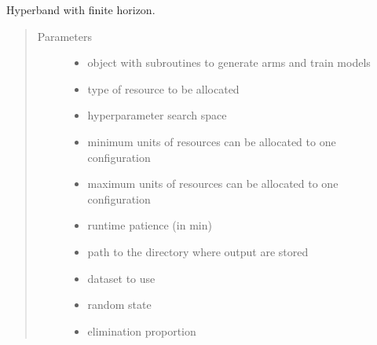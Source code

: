 \documentclass[letterpaper,10pt,english]{sphinxmanual}
\begin{document}
\begin{fulllineitems}
\label{\detokenize{index:hyperband.hyperband_finite.hyperband_finite}}
Hyperband with finite horizon.
\begin{quote}\begin{description}
\item[{Parameters}] \leavevmode\begin{itemize}
\item {} 
 \textendash{} object with subroutines to generate arms and train models

\item {} 
 \textendash{} type of resource to be allocated

\item {} 
 \textendash{} hyperparameter search space

\item {} 
 \textendash{} minimum units of resources can be allocated to one configuration

\item {} 
 \textendash{} maximum units of resources can be allocated to one configuration

\item {} 
 \textendash{} runtime patience (in min)

\item {} 
 \textendash{} path to the directory where output are stored

\item {} 
 \textendash{} dataset to use

\item {} 
 \textendash{} random state

\item {} 
 \textendash{} elimination proportion


\end{itemize}
\end{description}
\end{quote}
\end{fulllineitems}
\end{document}
